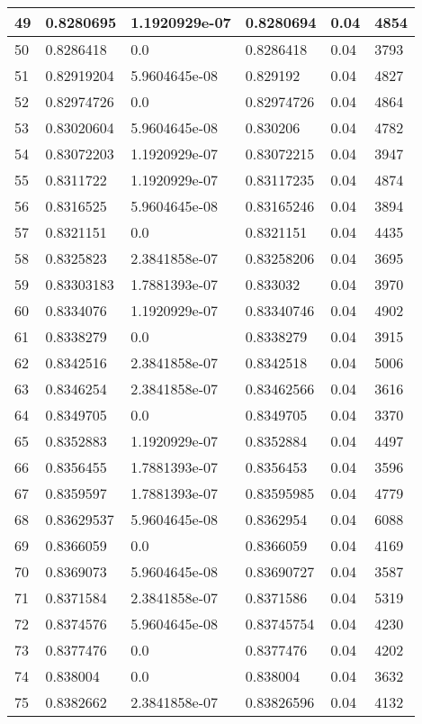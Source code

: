 \begin{longtable}{|l|l|l|l|l|l|}
49 & 0.8280695 & 1.1920929e-07 & 0.8280694 & 0.04 & 4854 \\ \hline 
50 & 0.8286418 & 0.0 & 0.8286418 & 0.04 & 3793 \\ \hline 
51 & 0.82919204 & 5.9604645e-08 & 0.829192 & 0.04 & 4827 \\ \hline 
52 & 0.82974726 & 0.0 & 0.82974726 & 0.04 & 4864 \\ \hline 
53 & 0.83020604 & 5.9604645e-08 & 0.830206 & 0.04 & 4782 \\ \hline 
54 & 0.83072203 & 1.1920929e-07 & 0.83072215 & 0.04 & 3947 \\ \hline 
55 & 0.8311722 & 1.1920929e-07 & 0.83117235 & 0.04 & 4874 \\ \hline 
56 & 0.8316525 & 5.9604645e-08 & 0.83165246 & 0.04 & 3894 \\ \hline 
57 & 0.8321151 & 0.0 & 0.8321151 & 0.04 & 4435 \\ \hline 
58 & 0.8325823 & 2.3841858e-07 & 0.83258206 & 0.04 & 3695 \\ \hline 
59 & 0.83303183 & 1.7881393e-07 & 0.833032 & 0.04 & 3970 \\ \hline 
60 & 0.8334076 & 1.1920929e-07 & 0.83340746 & 0.04 & 4902 \\ \hline 
61 & 0.8338279 & 0.0 & 0.8338279 & 0.04 & 3915 \\ \hline 
62 & 0.8342516 & 2.3841858e-07 & 0.8342518 & 0.04 & 5006 \\ \hline 
63 & 0.8346254 & 2.3841858e-07 & 0.83462566 & 0.04 & 3616 \\ \hline 
64 & 0.8349705 & 0.0 & 0.8349705 & 0.04 & 3370 \\ \hline 
65 & 0.8352883 & 1.1920929e-07 & 0.8352884 & 0.04 & 4497 \\ \hline 
66 & 0.8356455 & 1.7881393e-07 & 0.8356453 & 0.04 & 3596 \\ \hline 
67 & 0.8359597 & 1.7881393e-07 & 0.83595985 & 0.04 & 4779 \\ \hline 
68 & 0.83629537 & 5.9604645e-08 & 0.8362954 & 0.04 & 6088 \\ \hline 
69 & 0.8366059 & 0.0 & 0.8366059 & 0.04 & 4169 \\ \hline 
70 & 0.8369073 & 5.9604645e-08 & 0.83690727 & 0.04 & 3587 \\ \hline 
71 & 0.8371584 & 2.3841858e-07 & 0.8371586 & 0.04 & 5319 \\ \hline 
72 & 0.8374576 & 5.9604645e-08 & 0.83745754 & 0.04 & 4230 \\ \hline 
73 & 0.8377476 & 0.0 & 0.8377476 & 0.04 & 4202 \\ \hline 
74 & 0.838004 & 0.0 & 0.838004 & 0.04 & 3632 \\ \hline 
75 & 0.8382662 & 2.3841858e-07 & 0.83826596 & 0.04 & 4132 \\ \hline 
\end{longtable}